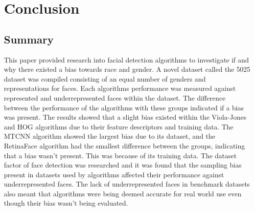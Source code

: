 \documentclass{l4proj}
\begin{document}
\chapter{Conclusion}

\section{Summary}
This paper provided research into facial detection algorithms to investigate if and why there existed a bias towards race and gender. A novel dataset called the 5025 dataset was compiled consisting of an equal number of genders and representations for faces. Each algorithms performance was measured against represented and underrepresented faces within the dataset. The difference between the performance of the algorithms with these groups indicated if a bias was present. The results showed that a slight bias existed within the Viola-Jones and HOG algorithms due to their feature descriptors and training data. The MTCNN algorithm showed the largest bias due to its dataset, and the RetinaFace algorithm had the smallest difference between the groups, indicating that a bias wasn't present. This was because of its training data. The dataset factor of face detection was researched and it was found that the sampling bias present in datasets used by algorithms affected their performance against underrepresented faces. The lack of underrepresented faces in benchmark datasets also meant that algorithms were being deemed accurate for real world use even though their bias wasn't being evaluated.
\end{document}
